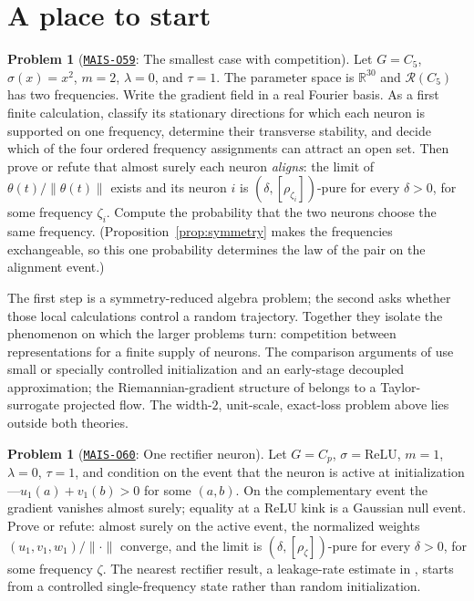 \documentclass[11pt]{amsart}
\newcommand{\Oid}[1]{\href{https://github.com/lionellevine/MAIS/blob/main/open-problems/MAIS-O#1.md}{\texttt{MAIS-O#1}}}
\theoremstyle{plain}
\theoremstyle{definition}
\newtheorem{problem}[theorem]{Problem}
\newcommand{\R}{\mathbb{R}}
\newcommand{\Rcl}{\mathcal{R}}
\begin{document}
\section{A place to start}\label{sec:start}

\begin{problem}[\Oid{59}: The smallest case with competition]\label{start:c5}
Let $G = C_5$, $\sigma(x) = x^2$, $m = 2$, $\lambda = 0$, and $\tau = 1$. The parameter space is $\R^{30}$ and $\Rcl(C_5)$ has two frequencies. Write the gradient field in a real Fourier basis. As a first finite calculation, classify its stationary directions for which each neuron is supported on one frequency, determine their transverse stability, and decide which of the four ordered frequency assignments can attract an open set. Then prove or refute that almost surely each neuron \emph{aligns}: the limit of $\theta(t)/\|\theta(t)\|$ exists and its neuron $i$ is $(\delta,[\rho_{\zeta_i}])$-pure for every $\delta>0$, for some frequency $\zeta_i$. Compute the probability that the two neurons choose the same frequency. (Proposition~\ref{prop:symmetry} makes the frequencies exchangeable, so this one probability determines the law of the pair on the alignment event.)
\end{problem}

The first step is a symmetry-reduced algebra problem; the second asks whether those local calculations control a random trajectory. Together they isolate the phenomenon on which the larger problems turn: competition between representations for a finite supply of neurons. The comparison arguments of \cite{he2026grokking} use small or specially controlled initialization and an early-stage decoupled approximation; the Riemannian-gradient structure of \cite{he2026spectral} belongs to a Taylor-surrogate projected flow. The width-$2$, unit-scale, exact-loss problem above lies outside both theories.

\begin{problem}[\Oid{60}: One rectifier neuron]\label{start:relu}
Let $G = C_p$, $\sigma = \mathrm{ReLU}$, $m = 1$, $\lambda = 0$, $\tau = 1$, and condition on the event that the neuron is active at initialization---$u_1(a) + v_1(b) > 0$ for some $(a,b)$. On the complementary event the gradient vanishes almost surely; equality at a ReLU kink is a Gaussian null event. Prove or refute: almost surely on the active event, the normalized weights $(u_1, v_1, w_1)/\|\cdot\|$ converge, and the limit is $(\delta, [\rho_\zeta])$-pure for every $\delta > 0$, for some frequency $\zeta$. The nearest rectifier result, a leakage-rate estimate in \cite{he2026grokking}, starts from a controlled single-frequency state rather than random initialization.
\end{problem}
\end{document}
